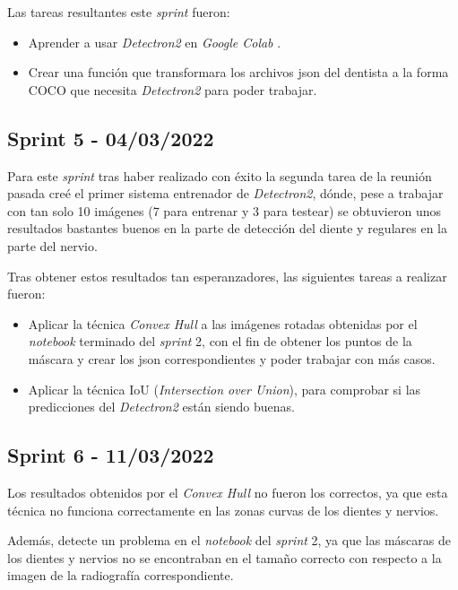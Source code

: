 Las tareas resultantes este \emph{sprint} fueron:
\begin{itemize}
    \item Aprender a usar \emph{Detectron2} en \emph{Google Colab} .
    \item Crear una función que transformara los archivos json del dentista a la forma COCO que necesita \emph{Detectron2} para poder trabajar.
\end{itemize}
\subsection{Sprint 5 - 04/03/2022}
Para este \emph{sprint} tras haber realizado con éxito la segunda tarea de la reunión pasada creé el primer sistema entrenador de \emph{Detectron2}, dónde, pese a trabajar con tan solo 10 imágenes (7 para entrenar y 3 para testear) se obtuvieron unos resultados bastantes buenos en la parte de detección del diente y regulares en la parte del nervio.

Tras obtener estos resultados tan esperanzadores, las siguientes tareas a realizar fueron:
\begin{itemize}
    \item Aplicar la técnica  \emph{Convex Hull} a las imágenes rotadas obtenidas por el  \emph{notebook} terminado del  \emph{sprint} 2, con el fin de obtener los puntos de la máscara y crear los json correspondientes y poder trabajar con más casos.
    \item Aplicar la técnica IoU (\emph{Intersection over Union}), para comprobar si las predicciones del \emph{Detectron2} están siendo buenas.
\end{itemize}
\subsection{Sprint 6 - 11/03/2022}
Los resultados obtenidos por el \emph{Convex Hull} no fueron los correctos, ya que esta técnica no funciona correctamente en las zonas curvas de los dientes y nervios.

Además, detecte un problema en el \emph{notebook} del \emph{sprint} 2, ya que las máscaras de los dientes y nervios no se encontraban en el tamaño correcto con respecto a la imagen de la radiografía correspondiente.

